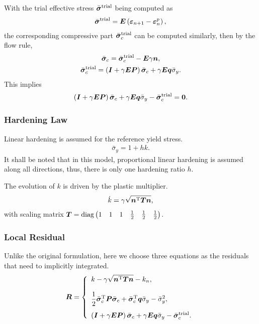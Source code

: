 With the trial effective stress $\bar{\bm{\sigma}}^\text{trial}$ being computed as
\begin{gather}
\bar{\bm{\sigma}}^\text{trial}=\bm{E}\left(\bm{\varepsilon}_{n+1}-\bm{\varepsilon}^p_n\right),
\end{gather}
the corresponding compressive part $\bar{\bm{\sigma}}^\text{trial}_c$ can be computed similarly, then by the flow rule,
\begin{gather}
\bar{\bm{\sigma}}_c=\bar{\bm{\sigma}}^\text{trial}_c-\bm{E}\gamma\bm{n},\\
\bar{\bm{\sigma}}^\text{trial}_c=\left(\bm{I}+\gamma\bm{E}\bm{P}\right)\bar{\bm{\sigma}}_c+\gamma\bm{E}\bm{q}\bar{\sigma}_y.
\end{gather}
This implies
\begin{gather}
\left(\bm{I}+\gamma\bm{E}\bm{P}\right)\bar{\bm{\sigma}}_c+\gamma\bm{E}\bm{q}\bar{\sigma}_y-\bar{\bm{\sigma}}^\text{trial}_c=\bm{0}.
\end{gather}
\subsubsection{Hardening Law}
Linear hardening is assumed for the reference yield stress.
\begin{gather}
\bar{\sigma}_y=1+hk.
\end{gather}
It shall be noted that in this model, proportional linear hardening is assumed along all directions, thus, there is only one hardening ratio $h$.

The evolution of $k$ is driven by the plastic multiplier.
\begin{gather}
\dot{k}=\gamma\sqrt{\bm{n}^{\mathrm{T}}\bm{T}\bm{n}},
\end{gather}
with scaling matrix $\bm{T}=\text{diag}\left(\begin{matrix}
1&1&1&\frac{1}{2}&\frac{1}{2}&\frac{1}{2}
\end{matrix}\right)$.
\subsubsection{Local Residual}
Unlike the original formulation, here we choose three equations as the residuals that need to implicitly integrated.
\begin{gather}
\bm{R}=\left\{
\begin{array}{l}
k-\gamma\sqrt{\bm{n}^{\mathrm{T}}\bm{T}\bm{n}}-k_n,\\[4mm]
\dfrac{1}{2}\bar{\bm{\sigma}}_c^{\mathrm{T}}\bm{P}\bar{\bm{\sigma}}_c+\bar{\bm{\sigma}}_c^{\mathrm{T}}\bm{q}\bar{\sigma}_y-\bar{\sigma}_y^2,\\[4mm]
\left(\bm{I}+\gamma\bm{E}\bm{P}\right)\bar{\bm{\sigma}}_c+\gamma\bm{E}\bm{q}\bar{\sigma}_y-\bar{\bm{\sigma}}^\text{trial}_c.
\end{array}
\right.
\end{gather}

